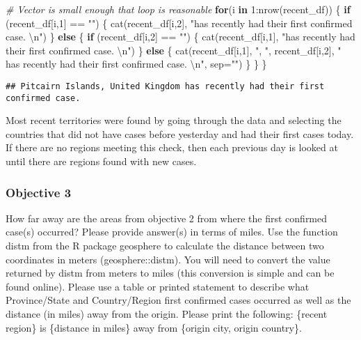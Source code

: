\documentclass[
]{article}
\newenvironment{Shaded}{\begin{snugshade}}{\end{snugshade}}
\newcommand{\AttributeTok}[1]{\textcolor[rgb]{0.77,0.63,0.00}{#1}}
\newcommand{\CommentTok}[1]{\textcolor[rgb]{0.56,0.35,0.01}{\textit{#1}}}
\newcommand{\ControlFlowTok}[1]{\textcolor[rgb]{0.13,0.29,0.53}{\textbf{#1}}}
\newcommand{\DecValTok}[1]{\textcolor[rgb]{0.00,0.00,0.81}{#1}}
\newcommand{\FunctionTok}[1]{\textcolor[rgb]{0.00,0.00,0.00}{#1}}
\newcommand{\NormalTok}[1]{#1}
\newcommand{\SpecialCharTok}[1]{\textcolor[rgb]{0.00,0.00,0.00}{#1}}
\newcommand{\StringTok}[1]{\textcolor[rgb]{0.31,0.60,0.02}{#1}}
\begin{document}
\begin{Shaded}
\begin{Highlighting}[]
\CommentTok{\# Vector is small enough that loop is reasonable}
\ControlFlowTok{for}\NormalTok{(i }\ControlFlowTok{in} \DecValTok{1}\SpecialCharTok{:}\FunctionTok{nrow}\NormalTok{(recent\_df))}
\NormalTok{\{}
  \ControlFlowTok{if}\NormalTok{ (recent\_df[i,}\DecValTok{1}\NormalTok{] }\SpecialCharTok{==} \StringTok{""}\NormalTok{) \{}
    \FunctionTok{cat}\NormalTok{(recent\_df[i,}\DecValTok{2}\NormalTok{], }\StringTok{"has recently had their first confirmed case. }\SpecialCharTok{\textbackslash{}n}\StringTok{"}\NormalTok{)}
\NormalTok{  \} }\ControlFlowTok{else}\NormalTok{ \{}
    \ControlFlowTok{if}\NormalTok{ (recent\_df[i,}\DecValTok{2}\NormalTok{] }\SpecialCharTok{==} \StringTok{""}\NormalTok{) \{}
      \FunctionTok{cat}\NormalTok{(recent\_df[i,}\DecValTok{1}\NormalTok{], }\StringTok{"has recently had their first confirmed case. }\SpecialCharTok{\textbackslash{}n}\StringTok{"}\NormalTok{)}
\NormalTok{    \} }\ControlFlowTok{else}\NormalTok{ \{}
      \FunctionTok{cat}\NormalTok{(recent\_df[i,}\DecValTok{1}\NormalTok{], }\StringTok{", "}\NormalTok{, recent\_df[i,}\DecValTok{2}\NormalTok{], }
          \StringTok{" has recently had their first confirmed case. }\SpecialCharTok{\textbackslash{}n}\StringTok{"}\NormalTok{, }\AttributeTok{sep=}\StringTok{""}\NormalTok{)}
\NormalTok{    \}}
\NormalTok{  \}}
\NormalTok{\}}
\end{Highlighting}
\end{Shaded}

\begin{verbatim}
## Pitcairn Islands, United Kingdom has recently had their first confirmed case.
\end{verbatim}

Most recent territories were found by going through the data and
selecting the countries that did not have cases before yesterday and had
their first cases today. If there are no regions meeting this check,
then each previous day is looked at until there are regions found with
new cases.

\hypertarget{objective-3}{%
\subsubsection{Objective 3}\label{objective-3}}

How far away are the areas from objective 2 from where the first
confirmed case(s) occurred? Please provide answer(s) in terms of miles.
Use the function distm from the R package geosphere to calculate the
distance between two coordinates in meters (geosphere::distm). You will
need to convert the value returned by distm from meters to miles (this
conversion is simple and can be found online). Please use a table or
printed statement to describe what Province/State and Country/Region
first confirmed cases occurred as well as the distance (in miles) away
from the origin. Please print the following: \{recent region\} is
\{distance in miles\} away from \{origin city, origin country\}.
\end{document}
